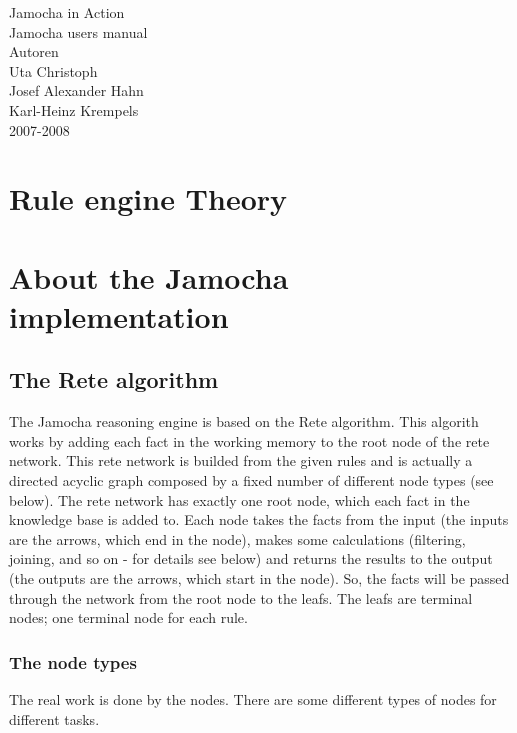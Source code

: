 \documentclass[a4paper,12pt]{scrbook}
\begin{document}
\begin{titlepage}
\begin{center}
\vspace*{4cm}
\Huge Jamocha in Action\\
\vspace{1cm}
\large Jamocha users manual\\
\vspace{1cm}
\normalsize Autoren\\
Uta Christoph\\
Josef Alexander Hahn\\
Karl-Heinz Krempels\\
\vspace{1cm}
2007-2008\\
\end{center}
\end{titlepage}

\tableofcontents
\newpage


\chapter{Rule engine Theory}







\chapter{About the Jamocha implementation}

\section{The Rete algorithm}
The Jamocha reasoning engine is based on the Rete algorithm. This algorith
works by adding each fact in the working memory to the root node of the rete
network. This rete network is builded from the given rules and is actually a
directed acyclic graph composed by a fixed number of different node types (see
below). The rete network has exactly one root node, which each fact in the
knowledge base is added to. Each node takes the facts from the input (the
inputs are the arrows, which end in the node), makes some calculations
(filtering, joining, and so on - for details see below) and returns the results
to the output (the outputs are the arrows, which start in the node). So, the
facts will be passed through the network from the root node to the leafs. The
leafs are terminal nodes; one terminal node for each rule.
\subsection{The node types}
The real work is done by the nodes. There are some different types of nodes for
different tasks.
\end{document}
